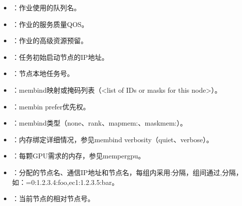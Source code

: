 \documentclass[a4paper,12pt,english]{sphinxmanual}
\begin{document}
\begin{itemize}
\item {} 
\sphinxAtStartPar
{}：作业使用的队列名。

\item {} 
\sphinxAtStartPar
{}：作业的服务质量QOS。

\item {} 
\sphinxAtStartPar
{}：作业的高级资源预留。

\item {} 
\sphinxAtStartPar
{}：任务初始启动节点的IP地址。

\item {} 
\sphinxAtStartPar
{}：节点本地任务号。

\item {} 
\sphinxAtStartPar
{}：\sphinxhyphen{}\sphinxhyphen{}mem\sphinxhyphen{}bind映射或掩码列表（<list of IDs or masks for this node>）。

\item {} 
\sphinxAtStartPar
{}：\sphinxhyphen{}\sphinxhyphen{}mem\sphinxhyphen{}bin prefer优先权。

\item {} 
\sphinxAtStartPar
{}：\sphinxhyphen{}\sphinxhyphen{}mem\sphinxhyphen{}bind类型（none、rank、map\sphinxhyphen{}mem:、mask\sphinxhyphen{}mem:）。

\item {} 
\sphinxAtStartPar
{}：内存绑定详细情况，参见\sphinxhyphen{}\sphinxhyphen{}mem\sphinxhyphen{}bind verbosity（quiet、verbose）。

\item {} 
\sphinxAtStartPar
{}：每颗GPU需求的内存，参见\sphinxhyphen{}\sphinxhyphen{}mem\sphinxhyphen{}per\sphinxhyphen{}gpu。

\item {} 
\sphinxAtStartPar
{}：分配的节点名、通信IP地址和节点名，每组内采用:分隔，组间通过,分隔，如：=0:1.2.3.4:foo,ec1:1.2.3.5:bar。

\item {} 
\sphinxAtStartPar
{}：当前节点的相对节点号。


\end{itemize}
\end{document}
